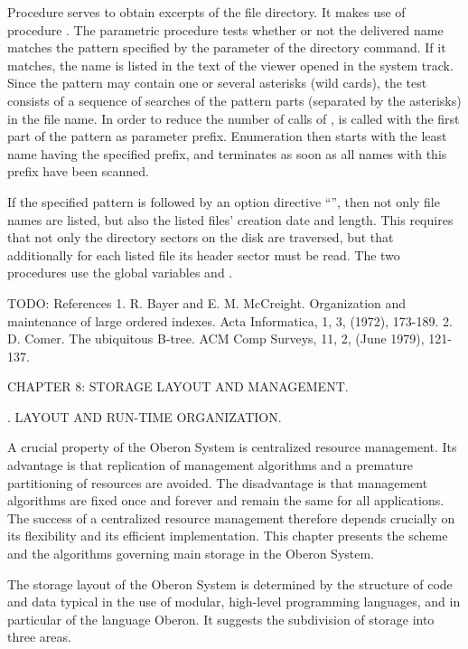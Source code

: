 Procedure  serves to obtain excerpts of the file directory. It makes use of procedure . The parametric procedure  tests whether or not the delivered name matches the pattern specified by the parameter of the directory command. If it matches, the name is listed in the text of the viewer opened in the system track. Since the pattern may contain one or several asterisks (wild cards), the test consists of a sequence of searches of the pattern parts (separated by the asterisks) in the file name. In order to reduce the number of calls of ,  is called with the first part of the pattern as parameter prefix. Enumeration then starts with the least name having the specified prefix, and terminates as soon as all names with this prefix have been scanned.

If the specified pattern is followed by an option directive ``\code{!}'', then not only file names are listed, but also the listed files' creation date and length. This requires that not only the directory sectors on the disk are traversed, but that additionally for each listed file its header sector must be read. The two procedures use the global variables  and .


TODO: References
1. R. Bayer and E. M. McCreight. Organization and maintenance of large ordered indexes. Acta Informatica, 1, 3, (1972), 173-189.
2. D. Comer. The ubiquitous B-tree. ACM Comp Surveys, 11, 2, (June 1979), 121-137.

\beginchapter CHAPTER 8: STORAGE LAYOUT AND MANAGEMENT.

. LAYOUT AND RUN-TIME ORGANIZATION.

A crucial property of the Oberon System is centralized resource management. Its advantage is that replication of management algorithms and a premature partitioning of resources are avoided. The disadvantage is that management algorithms are fixed once and forever and remain the same for all applications. The success of a centralized resource management therefore depends crucially on its flexibility and its efficient implementation. This chapter presents the scheme and the algorithms governing main storage in the Oberon System.

The storage layout of the Oberon System is determined by the structure of code and data typical in the use of modular, high-level programming languages, and in particular of the language Oberon. It suggests the subdivision of storage into three areas.

